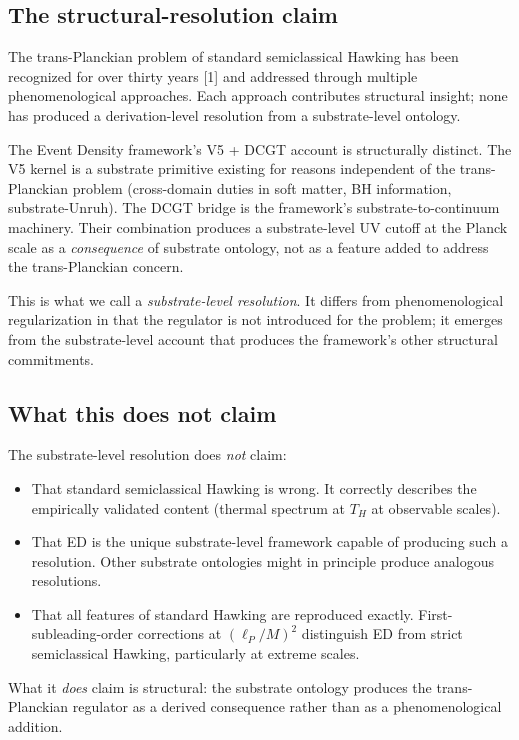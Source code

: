 \documentclass[11pt,a4paper]{article}
\begin{document}
\subsection{The structural-resolution claim}

The trans-Planckian problem of standard semiclassical Hawking has been recognized for over thirty years [1] and addressed through multiple phenomenological approaches. Each approach contributes structural insight; none has produced a derivation-level resolution from a substrate-level ontology.

The Event Density framework's V5 + DCGT account is structurally distinct. The V5 kernel is a substrate primitive existing for reasons independent of the trans-Planckian problem (cross-domain duties in soft matter, BH information, substrate-Unruh). The DCGT bridge is the framework's substrate-to-continuum machinery. Their combination produces a substrate-level UV cutoff at the Planck scale as a \emph{consequence} of substrate ontology, not as a feature added to address the trans-Planckian concern.

This is what we call a \emph{substrate-level resolution}. It differs from phenomenological regularization in that the regulator is not introduced for the problem; it emerges from the substrate-level account that produces the framework's other structural commitments.

\subsection{What this does not claim}

The substrate-level resolution does \emph{not} claim:
\begin{itemize}[noitemsep]
\item That standard semiclassical Hawking is wrong. It correctly describes the empirically validated content (thermal spectrum at $T_H$ at observable scales).
\item That ED is the unique substrate-level framework capable of producing such a resolution. Other substrate ontologies might in principle produce analogous resolutions.
\item That all features of standard Hawking are reproduced exactly. First-subleading-order corrections at $(\ell_P/M)^{2}$ distinguish ED from strict semiclassical Hawking, particularly at extreme scales.
\end{itemize}

What it \emph{does} claim is structural: the substrate ontology produces the trans-Planckian regulator as a derived consequence rather than as a phenomenological addition.
\end{document}
